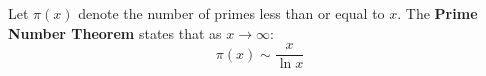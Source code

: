 \documentclass[aspectratio=169]{beamer}
\begin{document}
\begin{wallpaperframe}
Let $\pi(x)$ denote the number of primes less than or equal to $x$.
The \textbf{Prime Number Theorem} states that as $x \to \infty$:
\[
\pi(x) \sim \frac{x}{\ln x}
\]
\end{wallpaperframe}
\end{document}
